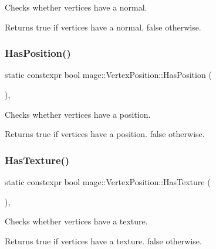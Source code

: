 Checks whether vertices have a normal.

\begin{DoxyReturn}{Returns}
{\ttfamily true} if vertices have a normal. {\ttfamily false} otherwise. 
\end{DoxyReturn}
\hypertarget{structmage_1_1_vertex_position_ab99ff01bb689bf62f693f13212d673ad}{}\label{structmage_1_1_vertex_position_ab99ff01bb689bf62f693f13212d673ad} 
\subsubsection{\texorpdfstring{Has\+Position()}{HasPosition()}}
{\footnotesize\ttfamily static constexpr bool mage\+::\+Vertex\+Position\+::\+Has\+Position (\begin{DoxyParamCaption}{ }\end{DoxyParamCaption})\hspace{0.3cm}{\ttfamily [static]}, {\ttfamily [noexcept]}}

Checks whether vertices have a position.

\begin{DoxyReturn}{Returns}
{\ttfamily true} if vertices have a position. {\ttfamily false} otherwise. 
\end{DoxyReturn}
\hypertarget{structmage_1_1_vertex_position_a593c015184b164cf9bcf82938d4db39f}{}\label{structmage_1_1_vertex_position_a593c015184b164cf9bcf82938d4db39f} 
\subsubsection{\texorpdfstring{Has\+Texture()}{HasTexture()}}
{\footnotesize\ttfamily static constexpr bool mage\+::\+Vertex\+Position\+::\+Has\+Texture (\begin{DoxyParamCaption}{ }\end{DoxyParamCaption})\hspace{0.3cm}{\ttfamily [static]}, {\ttfamily [noexcept]}}

Checks whether vertices have a texture.

\begin{DoxyReturn}{Returns}
{\ttfamily true} if vertices have a texture. {\ttfamily false} otherwise. 
\end{DoxyReturn}
\hypertarget{structmage_1_1_vertex_position_a07e7df87f6f70556d98c856a47643b73}{}\label{structmage_1_1_vertex_position_a07e7df87f6f70556d98c856a47643b73} 
